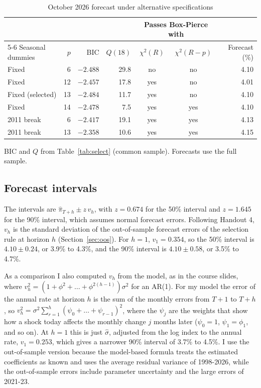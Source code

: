 \documentclass[11pt]{article}
\begin{document}
\begin{table}[htbp]
\centering
\small
\caption{October 2026 forecast under alternative specifications}
\label{tab:robust}
\begin{tabular}{@{}lrrrccr@{}}
\toprule
 & & & & \multicolumn{2}{c}{Passes Box-Pierce with} & \\
\cmidrule(lr){5-6}
Seasonal dummies & $p$ & BIC & $Q(18)$ & $\chi^2(R)$ & $\chi^2(R-p)$ & Forecast (\%)\\
\midrule
Fixed & 6 & $-2.488$ & 29.8 & no & no & 4.10\\
Fixed & 12 & $-2.457$ & 17.8 & yes & no & 4.01\\
\rowcolor{gray!30} Fixed (selected) & 13 & $-2.484$ & 11.7 & yes & no & 4.10\\
Fixed & 14 & $-2.478$ & 7.5 & yes & yes & 4.10\\
2011 break & 6 & $-2.417$ & 19.1 & yes & yes & 4.13\\
2011 break & 13 & $-2.358$ & 10.6 & yes & yes & 4.15\\
\bottomrule
\end{tabular}

\vspace{3pt}
{\footnotesize BIC and $Q$ from Table~\ref{tab:select} (common sample). Forecasts use the full sample.}
\end{table}

\subsection{Forecast intervals}

The intervals are $\hat\pi_{T+h}\pm z\,v_h$, with $z=0.674$ for the 50\% interval and $z=1.645$ for the 90\% interval, which assumes normal forecast errors. Following Handout 4, $v_h$ is the standard deviation of the out-of-sample forecast errors of the selection rule at horizon $h$ (Section~\ref{sec:oos}). For $h=1$, $v_1=0.354$, so the 50\% interval is $4.10\pm0.24$, or 3.9\% to 4.3\%, and the 90\% interval is $4.10\pm0.58$, or 3.5\% to 4.7\%.

As a comparison I also computed $v_h$ from the model, as in the course slides, where $v_h^2=(1+\phi^2+\dots+\phi^{2(h-1)})\sigma^2$ for an AR(1). For my model the error of the annual rate at horizon $h$ is the sum of the monthly errors from $T+1$ to $T+h$, so $v_h^2=\sigma^2\sum_{r=1}^{h}(\psi_0+\dots+\psi_{r-1})^2$, where the $\psi_j$ are the weights that show how a shock today affects the monthly change $j$ months later ($\psi_0=1$, $\psi_1=\phi_1$, and so on). At $h=1$ this is just $\hat\sigma$, adjusted from the log index to the annual rate, $v_1=0.253$, which gives a narrower 90\% interval of 3.7\% to 4.5\%. I use the out-of-sample version because the model-based formula treats the estimated coefficients as known and uses the average residual variance of 1998-2026, while the out-of-sample errors include parameter uncertainty and the large errors of 2021-23.
\end{document}
